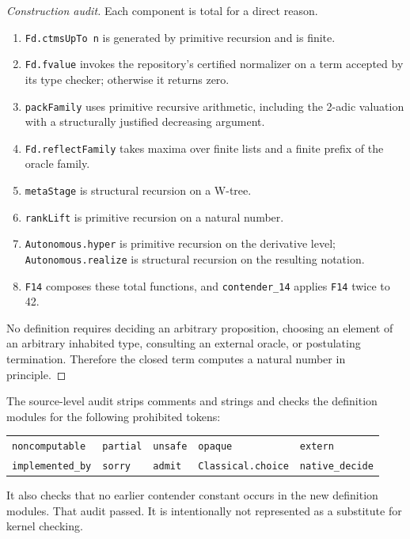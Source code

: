 \documentclass[11pt]{article}
\theoremstyle{definition}
\theoremstyle{remark}
\newcommand{\lean}[1]{\texttt{#1}}
\begin{document}
\begin{proof}[Construction audit]
Each component is total for a direct reason.

\begin{enumerate}[leftmargin=*,label=\arabic*.]
\item \lean{Fd.ctmsUpTo n} is generated by primitive recursion and is finite.
\item \lean{Fd.fvalue} invokes the repository's certified normalizer on a term
  accepted by its type checker; otherwise it returns zero.
\item \lean{packFamily} uses primitive recursive arithmetic, including the
  2-adic valuation with a structurally justified decreasing argument.
\item \lean{Fd.reflectFamily} takes maxima over finite lists and a finite
  prefix of the oracle family.
\item \lean{metaStage} is structural recursion on a W-tree.
\item \lean{rankLift} is primitive recursion on a natural number.
\item \lean{Autonomous.hyper} is primitive recursion on the derivative level;
  \lean{Autonomous.realize} is structural recursion on the resulting notation.
\item \lean{F14} composes these total functions, and
  \lean{contender\_14} applies \lean{F14} twice to 42.
\end{enumerate}

No definition requires deciding an arbitrary proposition, choosing an element
of an arbitrary inhabited type, consulting an external oracle, or postulating
termination.  Therefore the closed term computes a natural number in
principle.
\end{proof}

The source-level audit strips comments and strings and checks the definition
modules for the following prohibited tokens:
\begin{center}
\begin{tabular}{lllll}
\lean{noncomputable} & \lean{partial} & \lean{unsafe} & \lean{opaque} & \lean{extern}\\
\lean{implemented\_by} & \lean{sorry} & \lean{admit} & \lean{Classical.choice} & \lean{native\_decide}
\end{tabular}
\end{center}
It also checks that no earlier contender constant occurs in the new definition
modules.  That audit passed.  It is intentionally not represented as a
substitute for kernel checking.
\end{document}
